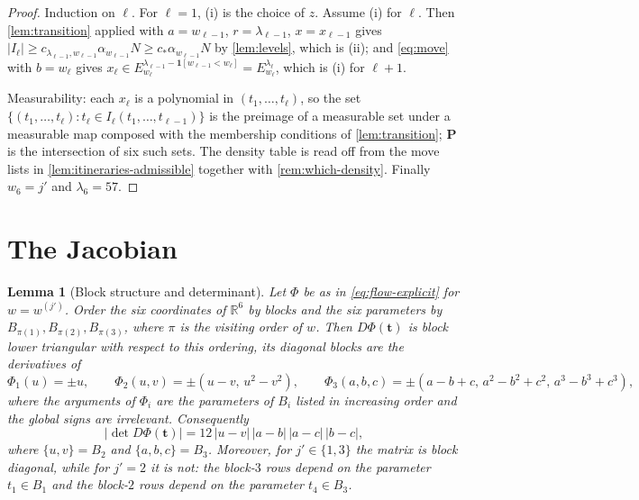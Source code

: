 \documentclass[11pt]{article}
\newtheorem{lemma}[theorem]{Lemma}
\newcommand{\R}{\mathbb{R}}
\newcommand{\one}{\mathbf{1}}
\newcommand{\abs}[1]{\left|#1\right|}
\begin{document}
\begin{proof}
  Induction on $\ell$.  For $\ell=1$, (i) is the choice of $z$.  Assume (i) for
  $\ell$.  Then \cref{lem:transition} applied with $a=w_{\ell-1}$,
  $r=\lambda_{\ell-1}$, $x=x_{\ell-1}$ gives
  $\abs{I_\ell}\geq c_{\lambda_{\ell-1},w_{\ell-1}}\alpha_{w_{\ell-1}}N
  \geq c_\ast\alpha_{w_{\ell-1}}N$ by \cref{lem:levels}, which is (ii); and
  \eqref{eq:move} with $b=w_\ell$ gives
  $x_\ell\in E_{w_\ell}^{\lambda_{\ell-1}-\one[w_{\ell-1}<w_\ell]}
  =E_{w_\ell}^{\lambda_\ell}$, which is (i) for $\ell+1$.

  Measurability: each $x_\ell$ is a polynomial in $(t_1,\dots,t_\ell)$, so the
  set $\{(t_1,\dots,t_\ell): t_\ell\in I_\ell(t_1,\dots,t_{\ell-1})\}$ is the
  preimage of a measurable set under a measurable map composed with the
  membership conditions of \cref{lem:transition}; $\mathbf P$ is the intersection
  of six such sets.  The density table is read off from the move lists in
  \cref{lem:itineraries-admissible} together with
  \cref{rem:which-density}.  Finally $w_6=j'$ and $\lambda_6=57$.
\end{proof}

\section{The Jacobian}
\label{sec:jacobian}

\begin{lemma}[Block structure and determinant]
  \label{lem:jacobian}
  Let $\Phi$ be as in \eqref{eq:flow-explicit} for $w=w^{(j')}$.  Order the six
  coordinates of $\R^6$ by blocks and the six parameters by
  $B_{\pi(1)},B_{\pi(2)},B_{\pi(3)}$, where $\pi$ is the visiting order of $w$.
  Then $D\Phi(\mathbf t)$ is block lower triangular with respect to this ordering,
  its diagonal blocks are the derivatives of
  \[
    \Phi_1(u)=\pm u,\qquad
    \Phi_2(u,v)=\pm(u-v,\,u^2-v^2),\qquad
    \Phi_3(a,b,c)=\pm(a-b+c,\,a^2-b^2+c^2,\,a^3-b^3+c^3),
  \]
  where the arguments of $\Phi_i$ are the parameters of $B_i$ listed in
  increasing order and the global signs are irrelevant.  Consequently
  \begin{equation}
    \label{eq:det}
    \abs{\det D\Phi(\mathbf t)}=12\,\abs{u-v}\,\abs{a-b}\,\abs{a-c}\,\abs{b-c},
  \end{equation}
  where $\{u,v\}=B_2$ and $\{a,b,c\}=B_3$.
  Moreover, for $j'\in\{1,3\}$ the matrix is block \emph{diagonal}, while for
  $j'=2$ it is not: the block-$3$ rows depend on the parameter $t_1\in B_1$ and
  the block-$2$ rows depend on the parameter $t_4\in B_3$.
\end{lemma}
\end{document}

